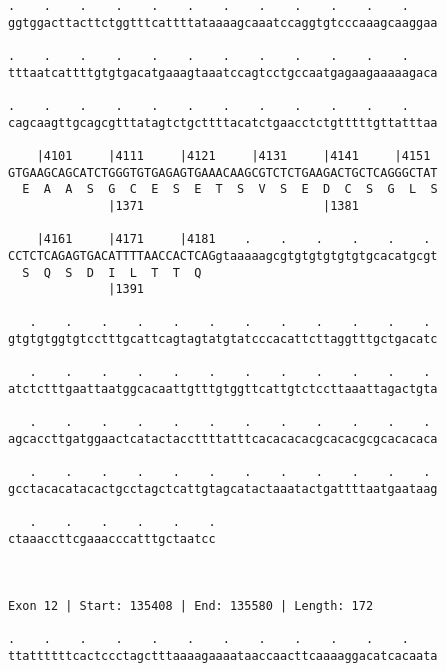 \documentclass{article}
\begin{document}
\begin{Verbatim}
.    .    .    .    .    .    .    .    .    .    .    .    
ggtggacttacttctggtttcattttataaaagcaaatccaggtgtcccaaagcaaggaa
                                                            
.    .    .    .    .    .    .    .    .    .    .    .    
tttaatcattttgtgtgacatgaaagtaaatccagtcctgccaatgagaagaaaaagaca
                                                            
.    .    .    .    .    .    .    .    .    .    .    .    
cagcaagttgcagcgtttatagtctgcttttacatctgaacctctgtttttgttatttaa
                                                            
    |4101     |4111     |4121     |4131     |4141     |4151 
GTGAAGCAGCATCTGGGTGTGAGAGTGAAACAAGCGTCTCTGAAGACTGCTCAGGGCTAT
  E  A  A  S  G  C  E  S  E  T  S  V  S  E  D  C  S  G  L  S
              |1371                         |1381           
  
    |4161     |4171     |4181    .    .    .    .    .    . 
CCTCTCAGAGTGACATTTTAACCACTCAGgtaaaaagcgtgtgtgtgtgtgcacatgcgt
  S  Q  S  D  I  L  T  T  Q                                 
              |1391                                         
  
   .    .    .    .    .    .    .    .    .    .    .    . 
gtgtgtggtgtcctttgcattcagtagtatgtatcccacattcttaggtttgctgacatc
                                                            
   .    .    .    .    .    .    .    .    .    .    .    . 
atctctttgaattaatggcacaattgtttgtggttcattgtctccttaaattagactgta
                                                            
   .    .    .    .    .    .    .    .    .    .    .    . 
agcaccttgatggaactcatactaccttttatttcacacacacgcacacgcgcacacaca
                                                            
   .    .    .    .    .    .    .    .    .    .    .    . 
gcctacacatacactgcctagctcattgtagcatactaaatactgattttaatgaataag
                                                            
   .    .    .    .    .    .
ctaaaccttcgaaacccatttgctaatcc
                             
                             
 
Exon 12 | Start: 135408 | End: 135580 | Length: 172
 
.    .    .    .    .    .    .    .    .    .    .    .    
ttattttttcactccctagctttaaaagaaaataaccaacttcaaaaggacatcacaata
                                                            

\end{Verbatim}
\end{document}
